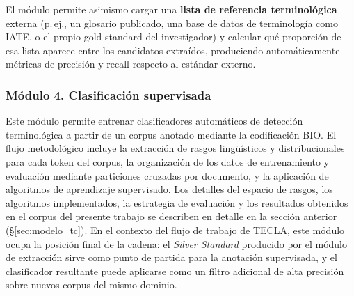 El módulo permite asimismo cargar una \textbf{lista de referencia terminológica} externa (p.\,ej., un glosario publicado, una base de datos de terminología como IATE, o el propio gold standard del investigador) y calcular qué proporción de esa lista aparece entre los candidatos extraídos, produciendo automáticamente métricas de precisión y recall respecto al estándar externo.

\subsubsection*{Módulo 4. Clasificación supervisada}

Este módulo permite entrenar clasificadores automáticos de detección terminológica a partir de un corpus anotado mediante la codificación BIO. El flujo metodológico incluye la extracción de rasgos lingüísticos y distribucionales para cada token del corpus, la organización de los datos de entrenamiento y evaluación mediante particiones cruzadas por documento, y la aplicación de algoritmos de aprendizaje supervisado. Los detalles del espacio de rasgos, los algoritmos implementados, la estrategia de evaluación y los resultados obtenidos en el corpus del presente trabajo se describen en detalle en la sección anterior (\S\ref{sec:modelo_tc}). En el contexto del flujo de trabajo de TECLA, este módulo ocupa la posición final de la cadena: el \textit{Silver Standard} producido por el módulo de extracción sirve como punto de partida para la anotación supervisada, y el clasificador resultante puede aplicarse como un filtro adicional de alta precisión sobre nuevos corpus del mismo dominio.

